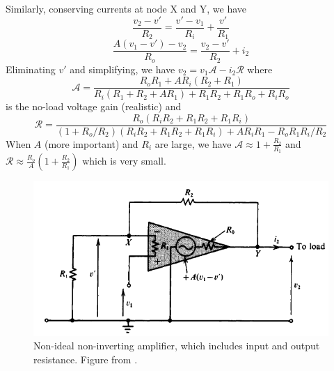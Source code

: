 \documentclass[a4paper]{article}
\begin{document}
\newpage
\begin{eg}
Similarly, conserving currents at node X and Y, we have
$$\frac{v_2-v'}{R_2}=\frac{v'-v_1}{R_i}+\frac{v'}{R_1}$$
$$\frac{A(v_1-v')-v_2}{R_o}=\frac{v_2-v'}{R_2}+i_2$$
Eliminating $v'$ and simplifying, we have $v_2=v_1\mathcal{A}-i_2\mathcal{R}$ where
$$\mathcal{A}=\frac{R_oR_1+AR_i(R_2+R_1)}{R_i(R_1+R_2+AR_1)+R_1R_2+R_1R_o+R_iR_o}$$
is the no-load voltage gain (realistic) and
$$\mathcal{R}=\frac{R_o(R_iR_2+R_1R_2+R_1R_i)}{(1+R_o/R_2)(R_iR_2+R_1R_2+R_1R_i)+AR_iR_1-R_oR_1R_i/R_2}$$
When $A$ (more important) and $R_i$ are large, we have $\mathcal{A}\approx 1+\frac{R_2}{R_1}$ and $\mathcal{R}\approx\frac{R_o}{A}(1+\frac{R_2}{R_1})$ which is very small.
\end{eg}
\begin{figure}[H]
    \centering
    \includegraphics[scale=0.9]{nonidealnoninverting.PNG}
    \caption{Non-ideal non-inverting amplifier, which includes input and output resistance. Figure from \cite{ahmed_spreadbury_1984}.}
    \label{nonidealnoninverting}
\end{figure}
\newpage
\end{document}
